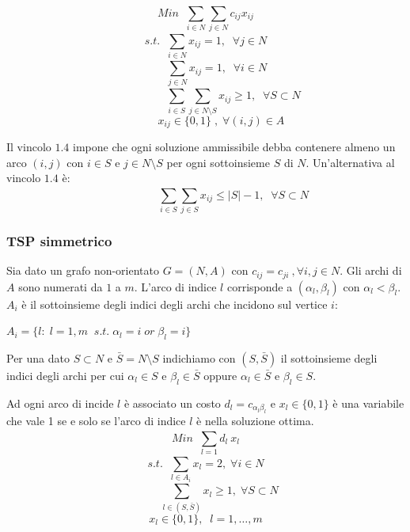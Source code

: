 \begin{equation}
	Min\;\;\sum_{i\in N}^{} \sum_{j\in N}^{} c_{ij} x_{ij}
\end{equation}
\begin{equation}
	s.t.\;\;\sum_{i\in N}^{} x_{ij} = 1,\;\;\forall j \in N
\end{equation}
\begin{equation}
	\;\;\;\;\;\;\;\sum_{j\in N}^{} x_{ij} = 1,\;\;\forall i \in N
\end{equation}
\begin{equation}
	\;\;\;\;\;\;\;\;\;\;\;\;\;\;\;\;\;\;\sum_{i\in S}^{} \sum_{j\in N\setminus S}^{} x_{ij} \ge 1,\;\;\forall S \subset N
\end{equation}
\begin{equation}
	\;\;\;\;\;\;\;\;\;\;x_{ij} \in \{0,1\}\;,\;\forall (i,j) \in A
\end{equation}

Il vincolo $1.4$ impone che ogni soluzione ammissibile debba contenere almeno un arco $(i,j)$ con $i\in S$ e $j\in N\setminus S$ per ogni sottoinsieme $S$ di $N$.
Un'alternativa al vincolo $1.4$ è:
\begin{equation}\tag{1.4'}
\;\;\;\;\;\;\;\;\;\;\;\;\;\;\;\;\;\;\sum_{i\in S}^{} \sum_{j\in S}^{} x_{ij} \le |S| - 1,\;\;\forall S \subset N
\end{equation}

\subsubsection{TSP simmetrico}
Sia dato un grafo non-orientato $G=(N,A)$ con $c_{ij} = c_{ji}\:,\forall i,j\in N$.\newline
Gli archi di $A$ sono numerati da $1$ a $m$. L'arco di indice $l$ corrisponde a $(\alpha_{l},\beta_{l})$ con $\alpha_{l} < \beta_{l}$.\newline
$A_{i}$ è il sottoinsieme degli indici degli archi che incidono sul vertice $i$:
\begin{center}
	$A_{i} = \{l:\;l=1,m\;\;s.t.\;\alpha_{l}=i\;or\;\beta_{l}=i\}$
\end{center}

Per una dato $S\subset N$ e $\bar{S} = N\setminus S$ indichiamo con $(S, \bar{S})$ il sottoinsieme degli indici degli archi per cui $\alpha_{l}\in S$ e $\beta_{l}\in \bar{S}$ oppure $\alpha_{l}\in \bar{S}$ e $\beta_{l}\in S$.

Ad ogni arco di incide $l$ è associato un costo $d_{l}=c_{\alpha_{l}\beta_{l}}$ e $x_{l}\in \{0,1\}$ è una variabile che vale 1 se e solo se l'arco di indice $l$ è nella soluzione ottima.
\begin{equation}
	Min\;\;\sum_{l=1}^{} d_{l}\:x_{l}
\end{equation}
\begin{equation}
	s.t.\;\;\sum_{l\in A_{i}}^{} x_{l}=2,\; \forall i\in N
\end{equation}
\begin{equation}
	\;\;\;\;\;\;\;\;\;\sum_{l\in (S, \bar{S})}^{} x_{l} \ge 1,\;\forall S \subset N
\end{equation}
\begin{equation}
	x_{l}\in \{0,1\},\;\;l=1,\dots,m
\end{equation}

